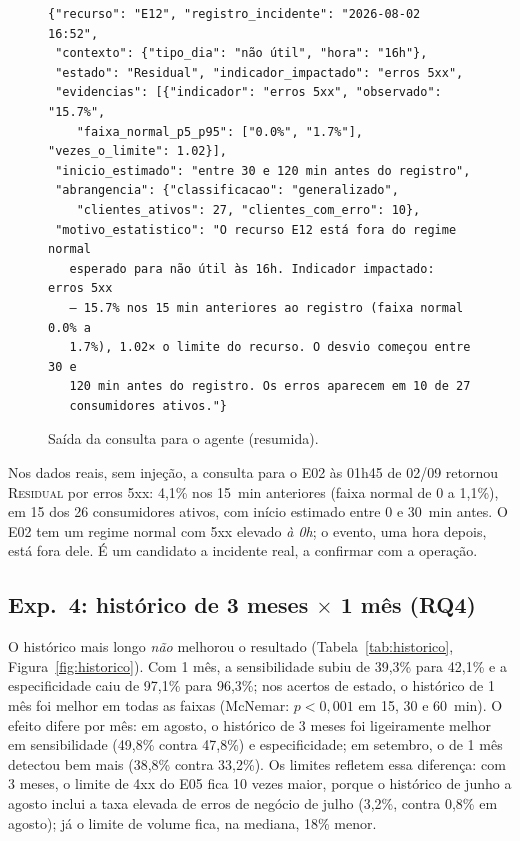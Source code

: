 \documentclass[sigconf,nonacm]{acmart}
\newcommand{\Residual}{\textsc{Residual}\xspace}
\begin{document}
\begin{figure}[t]
\begin{Verbatim}[fontsize=\scriptsize,frame=single]
{"recurso": "E12", "registro_incidente": "2026-08-02 16:52",
 "contexto": {"tipo_dia": "não útil", "hora": "16h"},
 "estado": "Residual", "indicador_impactado": "erros 5xx",
 "evidencias": [{"indicador": "erros 5xx", "observado": "15.7%",
    "faixa_normal_p5_p95": ["0.0%", "1.7%"], "vezes_o_limite": 1.02}],
 "inicio_estimado": "entre 30 e 120 min antes do registro",
 "abrangencia": {"classificacao": "generalizado",
    "clientes_ativos": 27, "clientes_com_erro": 10},
 "motivo_estatistico": "O recurso E12 está fora do regime normal
   esperado para não útil às 16h. Indicador impactado: erros 5xx
   — 15.7% nos 15 min anteriores ao registro (faixa normal 0.0% a
   1.7%), 1.02× o limite do recurso. O desvio começou entre 30 e
   120 min antes do registro. Os erros aparecem em 10 de 27
   consumidores ativos."}
\end{Verbatim}
\caption{Saída da consulta para o agente (resumida).}
\label{fig:json}
\end{figure}

Nos dados reais, sem injeção, a consulta para o E02 às 01h45 de 02/09 retornou \Residual por erros 5xx: 4,1\% nos 15~min anteriores (faixa normal de 0 a 1,1\%), em 15 dos 26 consumidores ativos, com início estimado entre 0 e 30~min antes. O E02 tem um regime normal com 5xx elevado \emph{à 0h}; o evento, uma hora depois, está fora dele. É um candidato a incidente real, a confirmar com a operação.

\subsection{Exp.~4: histórico de 3 meses $\times$ 1 mês (RQ4)}
O histórico mais longo \emph{não} melhorou o resultado (Tabela~\ref{tab:historico}, Figura~\ref{fig:historico}). Com 1 mês, a sensibilidade subiu de 39,3\% para 42,1\% e a especificidade caiu de 97,1\% para 96,3\%; nos acertos de estado, o histórico de 1 mês foi melhor em todas as faixas (McNemar: $p<0{,}001$ em 15, 30 e 60~min). O efeito difere por mês: em agosto, o histórico de 3 meses foi ligeiramente melhor em sensibilidade (49,8\% contra 47,8\%) e especificidade; em setembro, o de 1 mês detectou bem mais (38,8\% contra 33,2\%). Os limites refletem essa diferença: com 3 meses, o limite de 4xx do E05 fica 10 vezes maior, porque o histórico de junho a agosto inclui a taxa elevada de erros de negócio de julho (3,2\%, contra 0,8\% em agosto); já o limite de volume fica, na mediana, 18\% menor.
\end{document}

